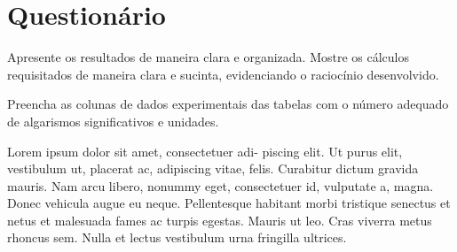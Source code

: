 \begin{fullwidth}
\noindent{}
\vspace{5mm}

\noindent{}

\noindent{}

\noindent{}

\noindent{}

\noindent{}
\end{fullwidth}

\vspace{5mm}

\section{Questionário}

\begin{question}[type={exam}]{1}
Apresente os resultados de maneira clara e organizada. Mostre os cálculos requisitados de maneira clara e sucinta, evidenciando o raciocínio desenvolvido.
\end{question}

\begin{question}[type={exam}]{1}
Preencha as colunas de dados experimentais das tabelas com o número adequado de algarismos significativos e unidades.
\end{question}

\begin{question}[type={exam}]{2}
Lorem ipsum dolor sit amet, consectetuer adi-
piscing elit. Ut purus elit, vestibulum ut, placerat ac, adipiscing vitae,
felis. Curabitur dictum gravida mauris. Nam arcu libero, nonummy
eget, consectetuer id, vulputate a, magna. Donec vehicula augue
eu neque. Pellentesque habitant morbi tristique senectus et netus
et malesuada fames ac turpis egestas. Mauris ut leo. Cras viverra
metus rhoncus sem. Nulla et lectus vestibulum urna fringilla ultrices.
\end{question}

